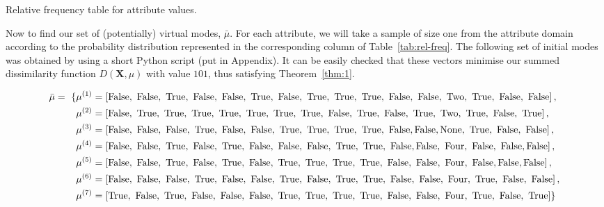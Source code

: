 \begin{example}
    \begin{table}[h]
    \resizebox{\textwidth}{!}{%
        
    }
    \caption{Relative frequency table for attribute values.}\label{tab:rel-freq}
    \end{table}

    Now to find our set of (potentially) virtual modes, \(\bar{\mu}\). For each
    attribute, we will take a sample of size one from the attribute domain
    according to the probability distribution represented in the corresponding
    column of Table~\ref{tab:rel-freq}. The following set of initial modes was 
    obtained by using a short Python script (put in Appendix). It can be easily
    checked that these vectors minimise our summed dissimilarity function
    \(D(\textbf{X}, \mu)\) with value \(101\), thus satisfying 
    Theorem~\ref{thm:1}.

    \begin{equation}
    \nonumber
    \begin{aligned}
        \bar{\mu} = \ \{ & \mu^{(1)} = \left[\false, \ \false, \ \true, \ 
        \false, \ \false, \ \true, \ \false, \ \true, \ \true, \ \true, \ 
        \false, \ \false, \ \text{Two}, \ \true, \ \false, \ \false\right],
        \\
        {} & \mu^{(2)} = \left[\false, \ \true, \ \true, \ \true, \ \true, \
        \true, \ \true, \ \true, \ \false, \ \true, \ \false, \ \true, \
        \text{Two}, \ \true, \ \false, \ \true\right],
        \\
        {} & \mu^{(3)} = \left[\false, \ \false, \ \false, \ \true, \ \false, \
        \false, \ \true, \ \true, \ \true, \ \true, \ \false, \false, 
        \text{None}, \ \true, \ \false, \ \false\right],
        \\
        {} & \mu^{(4)} = \left[\false, \ \false, \ \true, \ \false, \ \true, \
        \false, \ \false, \ \false, \ \true, \ \true, \ \false, \false, \
        \text{Four}, \ \false, \ \false, \false\right],
        \\
        {} & \mu^{(5)} = \left[\false, \ \false, \ \true, \ \false, \ \true, \
        \false, \ \true, \ \true, \ \true, \ \true, \ \false, \ \false, \
        \text{Four}, \ \false, \false, \false\right],
        \\
        {} & \mu^{(6)} = \left[\false, \ \false, \ \false, \ \true, \ \false, \
        \false, \ \true, \ \false, \ \true, \ \true, \ \false, \ \false, \
        \text{Four}, \ \true, \ \false, \ \false\right],
        \\
        {} & \mu^{(7)} = \left[\true, \ \false, \ \true, \ \false, \ \false, \
        \false, \ \true, \ \true, \ \true, \ \true, \ \false, \ \false, \ 
        \text{Four}, \ \true, \ \false, \ \true\right]\}\\
    \end{aligned}
    \end{equation}


\end{example}
